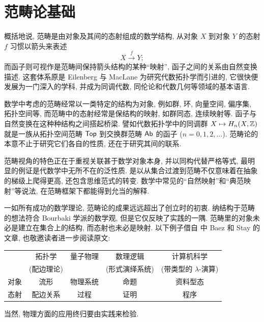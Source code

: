 
\chapter{范畴论基础}\label{sec:category}
概括地说, 范畴是由对象及其间的态射组成的数学结构, 从对象 $X$ 到对象 $Y$ 的态射 $f$ 习惯以箭头来表述
\[ X \xrightarrow{f} Y; \]
而函子则可视作是范畴间保持箭头结构的某种``映射'', 函子之间的关系由自然变换描述. 这套体系原是 Eilenberg 与 MacLane \cite{EM45} 为研究代数拓扑学而引进的, 它很快便发展为一门深入的学科, 并成为同调代数, 同伦论和代数几何等领域的基本语言.

数学中考虑的范畴经常以一类特定的结构为对象, 例如群, 环, 向量空间, 偏序集, 拓扑空间等, 而范畴中的态射经常是保结构的映射, 如群同态, 连续映射等. 函子与自然变换在这种种结构之间搭起桥梁. 譬如代数拓扑学中的同调群 $X \mapsto H_n(X, \mathbb{Z})$ 就是一族从拓扑空间范畴 $\mathsf{Top}$ 到交换群范畴 $\mathsf{Ab}$ 的函子 ($n=0,1,2,\ldots$). 范畴论的本意不止于研究它们各自的性质, 还在于研究其间的联系.

范畴视角的特色正在于重视关联甚于数学对象本身, 并以同构代替严格等式, 最明显的例证是代数学中无所不在的泛性质. 是以从集合过渡到范畴不仅意味着在抽象的梯级上爬得更高, 还包含思维范式的转变. 数学中常见的``自然映射''和``典范映射''等说法, 在范畴框架下都能得到允当的解释.

一如所有成功的数学理论, 范畴论的成果远远超出了创立时的初衷. 纳结构于范畴的想法符合 Bourbaki 学派的数学观, 但是它仅反映了实践的一隅. 范畴里的对象未必是建立在集合上的结构, 而态射也未必是映射. 以下例子借自 \cite{Co11} 中 Baez 和 Stay 的文章, 也敬邀读者进一步阅读原文:
\begin{center}
\begin{tabular}{|c|c|c|c|c|} \hline
	& 拓扑学 & 量子物理 & 数理逻辑 & 计算机科学 \\
	& (配边理论) & & (形式演绎系统) & (带类型的 $\lambda$-演算) \\ \hline
	对象 &  流形 &  物理系统 &  命题 & 资料型态 \\ \hline
	态射 &  配边关系 &  过程 & 证明 & 程序 \\ \hline
\end{tabular}
\end{center}
当然, 物理方面的应用终归要由实践来检验.

